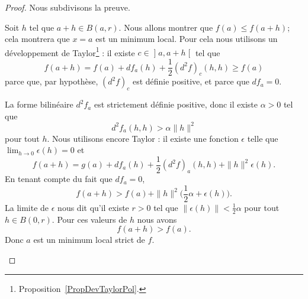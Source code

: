 \begin{proof}
	Nous subdivisons la preuve.

	\begin{subproof}

		\spitem[\ref{ITEMooCBMYooQQMqQL}]

		Soit \( h\) tel que \( a+h\in B(a,r)\). Nous allons montrer que \( f(a)\leq f(a+h)\); cela montrera que \( x=a\) est un minimum local. Pour cela nous utilisons un développement de Taylor\footnote{Proposition~\ref{PropDevTaylorPol}.} : il existe \( c\in \mathopen] a , a+h \mathclose[\) tel que
		\begin{equation}
			f(a+h)=f(a)+df_a(h)+\frac{ 1 }{2}(d^2f)_c(h,h)\geq f(a)
		\end{equation}
		parce que, par hypothèse, \( (d^2f)_c\) est définie positive, et parce que \( df_a=0\).

		\spitem[\ref{ITEMooCVFVooWltGqI}]

		La forme bilinéaire \( d^2f_a\) est strictement définie positive, donc il existe \( \alpha>0\) tel que
		\begin{equation}
			d^2f_a(h,h)>\alpha\| h \|^2
		\end{equation}
		pour tout \( h\). Nous utilisons encore Taylor : il existe une fonction \( \epsilon\) telle que \( \lim_{h\to 0} \epsilon(h)=0\) et
		\begin{equation}
			f(a+h)=g(a)+df_a(h)+\frac{ 1 }{2}(d^2f)_a(h,h)+\| h \|^2\epsilon(h).
		\end{equation}
		En tenant compte du fait que \( df_a=0\),
		\begin{equation}
			f(a+h)>f(a)+\| h \|^2\big( \frac{ 1 }{2}\alpha+ \epsilon(h) \big).
		\end{equation}
		La limite de \( \epsilon\) nous dit qu'il existe \( r>0\) tel que \( \| \epsilon(h) \|<\frac{ 1 }{2}\alpha\) pour tout \( h\in B(0,r)\). Pour ces valeurs de \( h\) nous avons
		\begin{equation}
			f(a+h)>f(a).
		\end{equation}
		Donc \( a\) est un minimum local strict de \( f\).


\end{subproof}
\end{proof}
